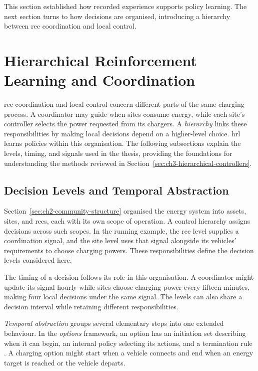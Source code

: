 This section established how recorded experience supports policy learning. The next section turns to how decisions are organised, introducing a hierarchy between \gls{rec} coordination and local control.

\FloatBarrier
\section{Hierarchical Reinforcement Learning and Coordination}
\label{sec:ch2-hierarchy}

\gls{rec} coordination and local control concern different parts of the same charging process. A coordinator may guide when sites consume energy, while each site's controller selects the power requested from its chargers. A \emph{hierarchy} links these responsibilities by making local decisions depend on a higher-level choice. \gls{hrl} learns policies within this organisation. The following subsections explain the levels, timing, and signals used in the thesis, providing the foundations for understanding the methods reviewed in Section~\ref{sec:ch3-hierarchical-controllers}.

\subsection{Decision Levels and Temporal Abstraction}
\label{sec:ch2-temporal-abstraction}

Section~\ref{sec:ch2-community-structure} organised the energy system into assets, sites, and \glspl{rec}, each with its own scope of operation. A control hierarchy assigns decisions across such scopes. In the running example, the \gls{rec} level supplies a coordination signal, and the site level uses that signal alongside its vehicles' requirements to choose charging powers. These responsibilities define the decision levels considered here.

The timing of a decision follows its role in this organisation. A coordinator might update its signal hourly while sites choose charging power every fifteen minutes, making four local decisions under the same signal. The levels can also share a decision interval while retaining different responsibilities.

\emph{Temporal abstraction} groups several elementary steps into one extended behaviour. In the \emph{options} framework, an option has an initiation set describing when it can begin, an internal policy selecting its actions, and a termination rule \parencite{sutton1999options}. A charging option might start when a vehicle connects and end when an energy target is reached or the vehicle departs.

